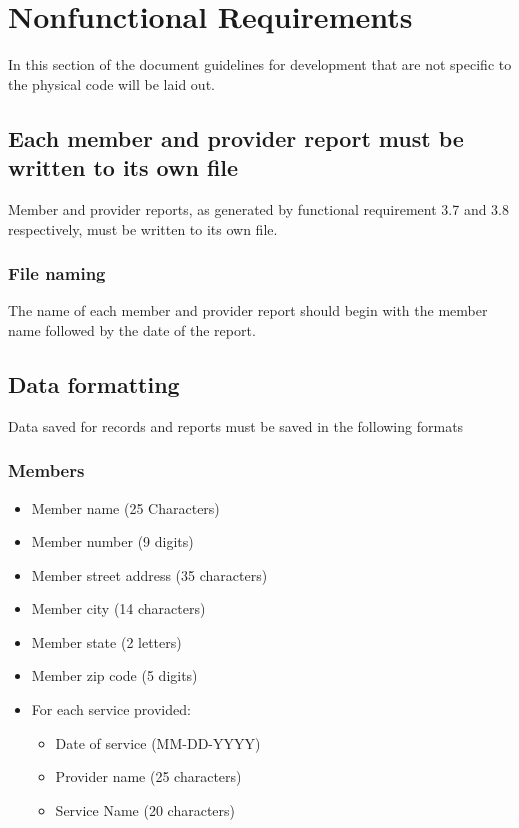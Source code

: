 \documentclass{article}
\begin{document}
\section{Nonfunctional Requirements}
In this section of the document guidelines for development that are not specific to the physical code will be laid out. 

\subsection{Each member and provider report must be written to its own file}
Member and provider reports, as generated by functional requirement 3.7 and 3.8 respectively, must be written to its own file.

\subsubsection{File naming}
The name of each member and provider report should begin with the member name followed by the date of the report.

\subsection{Data formatting}
Data saved for records and reports must be saved in the following formats
\subsubsection{Members}
\begin{itemize}
\item Member name (25 Characters)
\item Member number (9 digits)
\item Member street address (35  characters)
\item Member city (14 characters)
\item Member state (2 letters)
\item Member zip code (5 digits)
\item For each service provided:
\begin{itemize}
\item Date of service (MM-DD-YYYY)
\item Provider name (25 characters)
\item Service Name (20 characters)
\end{itemize}
\end{itemize}
\end{document}
